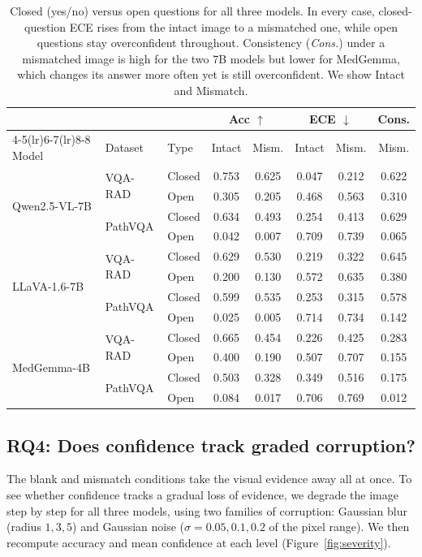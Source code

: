 \documentclass{article}
\begin{document}
\begin{table}[t]
\centering
\caption{Closed (yes/no) versus open questions for all three models. In every case,
closed-question ECE rises from the intact image to a mismatched one, while open
questions stay overconfident throughout. Consistency (\emph{Cons.}) under a
mismatched image is high for the two 7B models but lower for MedGemma, which changes
its answer more often yet is still overconfident. We show Intact and Mismatch.}
\label{tab:strata}
\small
\setlength{\tabcolsep}{4pt}
\begin{tabular}{lll cc cc c}
\toprule
& & & \multicolumn{2}{c}{Acc $\uparrow$} & \multicolumn{2}{c}{ECE $\downarrow$} & Cons. \\
\cmidrule(lr){4-5}\cmidrule(lr){6-7}\cmidrule(lr){8-8}
Model & Dataset & Type & Intact & Mism. & Intact & Mism. & Mism. \\
\midrule
\multirow{4}{*}{Qwen2.5-VL-7B}
 & \multirow{2}{*}{VQA-RAD} & Closed & 0.753 & 0.625 & 0.047 & 0.212 & 0.622 \\
 & & Open   & 0.305 & 0.205 & 0.468 & 0.563 & 0.310 \\
\cmidrule(l){2-8}
 & \multirow{2}{*}{PathVQA} & Closed & 0.634 & 0.493 & 0.254 & 0.413 & 0.629 \\
 & & Open   & 0.042 & 0.007 & 0.709 & 0.739 & 0.065 \\
\midrule
\multirow{4}{*}{LLaVA-1.6-7B}
 & \multirow{2}{*}{VQA-RAD} & Closed & 0.629 & 0.530 & 0.219 & 0.322 & 0.645 \\
 & & Open   & 0.200 & 0.130 & 0.572 & 0.635 & 0.380 \\
\cmidrule(l){2-8}
 & \multirow{2}{*}{PathVQA} & Closed & 0.599 & 0.535 & 0.253 & 0.315 & 0.578 \\
 & & Open   & 0.025 & 0.005 & 0.714 & 0.734 & 0.142 \\
\midrule
\multirow{4}{*}{MedGemma-4B}
 & \multirow{2}{*}{VQA-RAD} & Closed & 0.665 & 0.454 & 0.226 & 0.425 & 0.283 \\
 & & Open   & 0.400 & 0.190 & 0.507 & 0.707 & 0.155 \\
\cmidrule(l){2-8}
 & \multirow{2}{*}{PathVQA} & Closed & 0.503 & 0.328 & 0.349 & 0.516 & 0.175 \\
 & & Open   & 0.084 & 0.017 & 0.706 & 0.769 & 0.012 \\
\bottomrule
\end{tabular}
\end{table}

\subsection{RQ4: Does confidence track graded corruption?}
The blank and mismatch conditions take the visual evidence away all at once. To see
whether confidence tracks a gradual loss of evidence, we degrade the image step by
step for all three models, using two families of corruption: Gaussian blur (radius
$1,3,5$) and Gaussian noise ($\sigma{=}0.05,0.1,0.2$ of the pixel range). We then
recompute accuracy and mean confidence at each level (Figure~\ref{fig:severity}).
\end{document}
